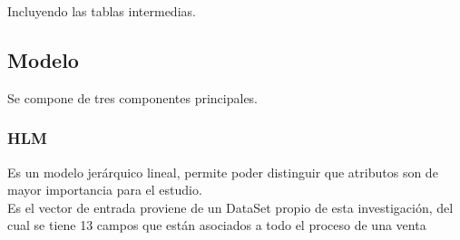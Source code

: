 \documentclass[conference]{IEEEtran}
\begin{document}
Incluyendo las tablas intermedias.

\subsection{Modelo}
Se compone de tres componentes principales.\\
\subsubsection{HLM}
Es un modelo jerárquico lineal, permite poder distinguir que atributos son de mayor importancia para el estudio.\\
Es el vector de entrada proviene de un DataSet propio de esta investigación, del cual se tiene 13 campos que están asociados a todo el proceso de una venta\\
\end{document}
